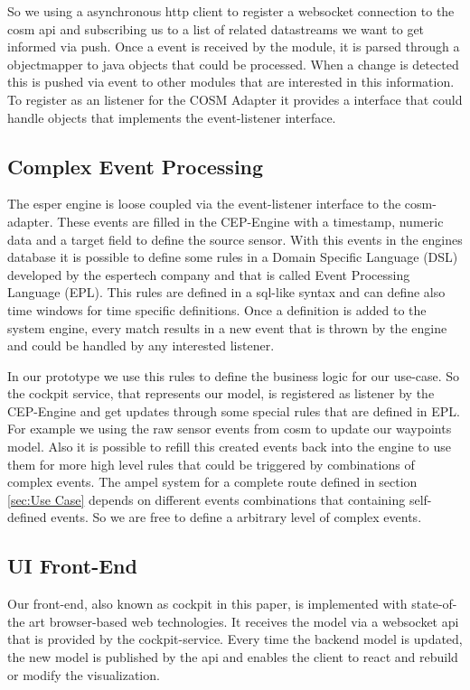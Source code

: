 \documentclass{acm_proc_article-sp}
\begin{document}
So we using a asynchronous http client to register a websocket connection to the cosm api and subscribing us to a list of related datastreams we want to get informed via push.
Once a event is received by the module, it is parsed through a objectmapper to java objects that could be processed. When a change is detected this is pushed via event to other modules that are interested in this information.
To register as an listener for the COSM Adapter it provides a interface that could handle objects that implements the event-listener interface.


\subsection{Complex Event Processing}

The esper engine is loose coupled via the event-listener interface to the cosm-adapter.
These events are filled in the CEP-Engine with a timestamp, numeric data and a target field to define the source sensor.
With this events in the engines database it is possible to define some rules in a Domain Specific Language (DSL) developed by the espertech company and that is called Event Processing Language (EPL). This rules are defined in a sql-like syntax and can define also time windows for time specific definitions.
Once a definition is added to the system engine, every match results in a new event that is thrown by the engine and could be handled by any interested listener.

In our prototype we use this rules to define the business logic for our use-case.
So the cockpit service, that represents our model, is registered as listener by the CEP-Engine and get updates through some special rules that are defined in EPL.
For example we using the raw sensor events from cosm to update our waypoints model.
Also it is possible to refill this created events back into the engine to use them for more high level rules that could be triggered by combinations of complex events.
The ampel system  for a complete route defined in section \ref{sec:Use Case} depends on different events combinations that containing self-defined events.
So we are free to define a arbitrary level of complex events.


\subsection{UI Front-End}
Our front-end, also known as cockpit in this paper, is implemented with state-of-the art browser-based web technologies.
It receives the model via a websocket api that is provided by the cockpit-service.
Every time the backend model is updated, the new model is published by the api and enables the client to react and rebuild or modify the visualization.
\end{document}
